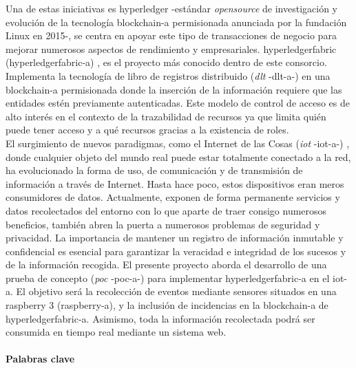 \documentclass[12pt,a4paper, twoside]{report}
\begin{document}
	Una de estas iniciativas es \gls{hyperledger} \cite{hyperledger:url} -estándar \textit{\gls{opensource}} de investigación y evolución de la tecnología \gls{blockchain-a} permisionada anunciada por la fundación Linux en 2015-, se centra en apoyar este tipo de transacciones de negocio para mejorar numerosos aspectos de rendimiento y empresariales. \gls{hyperledgerfabric} (\gls{hyperledgerfabric-a}) \cite{hyperledgerfabric:url}, es el proyecto más conocido dentro de este consorcio. Implementa la tecnología de libro de registros distribuido (\textit{\gls{dlt}} -\gls{dlt-a}-) \cite{wattenhofer:DLT} en una \gls{blockchain-a} permisionada donde la inserción de la información requiere que las entidades estén previamente autenticadas. Este modelo de control de acceso es de alto interés en el contexto de la trazabilidad de recursos ya que limita quién puede tener acceso y a qué recursos gracias a la existencia de roles. \\
		
	El surgimiento de nuevos paradigmas, como el Internet de las Cosas (\textit{\gls{iot}} -\gls{iot-a}-) \cite{christidis:2016:bsciot}, \cite{dorri:2017:TOBI} donde cualquier objeto del mundo real puede estar totalmente conectado a la red, ha evolucionado la forma de uso, de comunicación y de transmisión de información a través de Internet. Hasta hace poco, estos dispositivos eran meros consumidores de datos. Actualmente, exponen de forma permanente servicios y datos recolectados del entorno con lo que aparte de traer consigo numerosos beneficios, también abren la puerta a numerosos problemas de seguridad y privacidad. La importancia de mantener un registro de información inmutable y confidencial es esencial para garantizar la veracidad e integridad de los sucesos y de la información recogida. El presente proyecto aborda el desarrollo de una prueba de concepto (\textit{\gls{poc}} -\gls{poc-a}-) para implementar \gls{hyperledgerfabric-a} en el \gls{iot-a}. El objetivo será la recolección de eventos mediante sensores situados en una \gls{raspberry} 3 (\gls{raspberry-a}), y la inclusión de incidencias en la \gls{blockchain-a} de \gls{hyperledgerfabric-a}. Asimismo, toda la información recolectada podrá ser consumida en tiempo real mediante un sistema web.
	
	\newpage	
	
	\paragraph{Palabras clave \\}
	\thispagestyle{empty}
\end{document}
